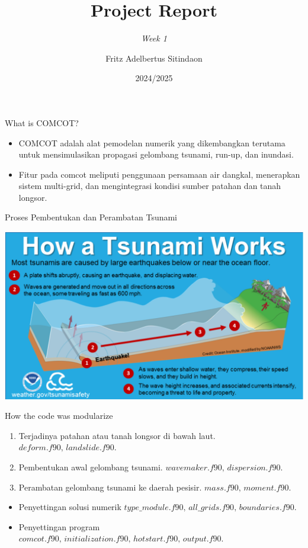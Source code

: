 \documentclass{beamer}
\title{Project Report}
\subtitle{\textit{Week 1}}
\date[]{2024/2025}
\author[Fritz]{Fritz Adelbertus Sitindaon}
\begin{document}
\begin{frame}
\titlepage
\end{frame}



% 
\begin{frame}{What is COMCOT?}
    \begin{itemize}
        \item COMCOT adalah alat pemodelan 
        numerik yang dikembangkan terutama 
        untuk mensimulasikan propagasi gelombang 
        tsunami, run-up, dan inundasi. 
        \item Fitur pada comcot meliputi penggunaan 
        persamaan air dangkal, menerapkan sistem multi-grid,
        dan mengintegrasi kondisi sumber patahan dan tanah longsor.
    \end{itemize}
\end{frame}

\begin{frame}{Proses Pembentukan dan Perambatan Tsunami}
    \begin{center}
        \includegraphics[scale=0.3]{figure/how_tsunami_works.png}
    \end{center}
\end{frame}

\begin{frame}{How the code was modularize}
    \begin{enumerate}
        \item Terjadinya patahan atau tanah longsor di bawah laut. $deform.f90,\,landslide.f90$.
        \item Pembentukan awal gelombang tsunami. $wavemaker.f90,\,dispersion.f90$.
        \item Perambatan gelombang tsunami ke daerah pesisir. $mass.f90,\,moment.f90$.
    \end{enumerate}
    \begin{itemize}
        \item Penyettingan solusi numerik $type\_module.f90,\,all\_grids.f90,\,boundaries.f90$.
        \item Penyettingan program $comcot.f90,\,initialization.f90,\,hotstart.f90,\,output.f90$.
    \end{itemize}
\end{frame}
\end{document}
